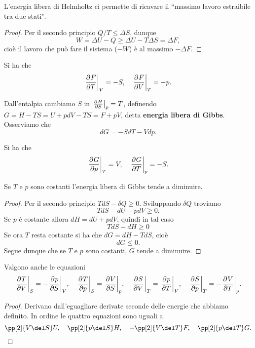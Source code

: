 \begin{remark}
L'energia libera di Helmholtz ci permette di ricavare il ``massimo lavoro estraibile tra due stati".
\end{remark}
\begin{proof}
Per il secondo principio $Q/T\leq \Delta S$, dunque
\[W=\Delta U-Q\geq \Delta U-T\Delta S=\Delta F,\]
cio\`e il lavoro che pu\`o fare il sistema ($-W$) \`e al massimo $-\Delta F$.
\end{proof}

\begin{remark}
Si ha che
\[\ppb TFV=-S,\quad \ppb VFT=-p.\]
\end{remark}

\begin{definition}
Dall'entalpia cambiamo $S$ in $\ppb SHp=T$, definendo $G=H-TS=U+pdV-TS=F+pV$, detta \textbf{energia libera di Gibbs}. Osserviamo che
\[dG=-SdT-Vdp.\]
\end{definition}

\begin{remark}
Si ha che
\[\ppb pGT=V,\quad \ppb TGp=-S.\]
\end{remark}

\begin{proposition}\label{GibbsDiminuiscePerPressioneETemperaturaCostanti}
Se $T$ e $p$ sono costanti l'energia libera di Gibbs tende a diminuire.
\end{proposition}
\begin{proof}
Per il secondo principio $TdS-\delta Q\geq 0$. Sviluppando $\delta Q$ troviamo
\[TdS-dU-pdV\geq0.\]
Se $p$ \`e costante allora $dH=dU+pdV$, quindi in tal caso
\[TdS-dH\geq 0\]
Se ora $T$ resta costante si ha che $dG=dH-TdS$, cio\`e
\[dG\leq 0.\]
Segue dunque che se $T$ e $p$ sono costanti, $G$ tende a diminuire.
\end{proof}


\begin{proposition}\label{RelazioniMaxwell}
Valgono anche le equazioni
\[\ppb VTS=-\ppb SpV,\quad \ppb pTS=\ppb SVp,\quad \ppb VST=\ppb TpV,\quad \ppb pST=-\ppb TVp.\]
\end{proposition}
\begin{proof}
Derivano dall'eguagliare derivate seconde delle energie che abbiamo definito. In ordine le quattro equazioni sono uguali a
\[\pp[2]{V\del S}U,\quad \pp[2]{p\del S}H,\quad -\pp[2]{V\del T}F,\quad \pp[2]{p\del T}G.\]
\end{proof}

